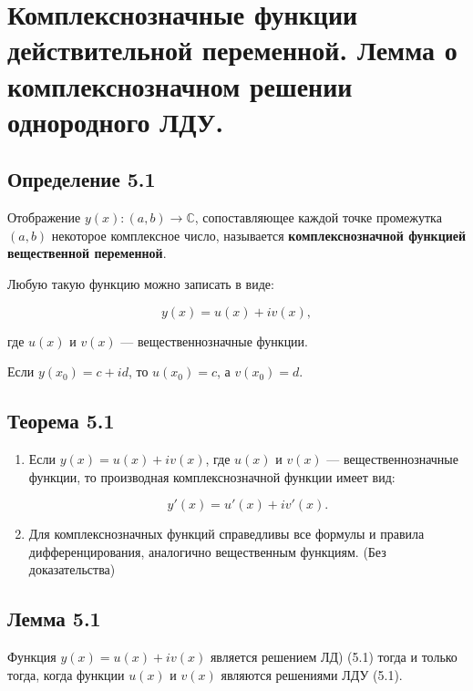 {
	\section{Комплекснозначные функции действительной переменной. Лемма о комплекснозначном решении однородного
	ЛДУ.}

	\subsection*{Определение 5.1}


	Отображение \( y(x) : (a, b) \rightarrow \mathbb{C} \), сопоставляющее каждой точке промежутка \( (a, b) \) некоторое комплексное число, называется \textbf{комплекснозначной функцией вещественной переменной}.

	Любую такую функцию можно записать в виде:


	\[
	y(x) = u(x) + iv(x),
	\]


	где \( u(x) \) и \( v(x) \) — вещественнозначные функции.

	Если \( y(x_0) = c + id \), то \( u(x_0) = c \), а \( v(x_0) = d \).

	\subsection*{Теорема 5.1}

	\begin{enumerate}
	\item Если \( y(x) = u(x) + i v(x) \), где \( u(x) \) и \( v(x) \) — вещественнозначные функции, то производная комплекснозначной функции имеет вид:
	

	\[
	y'(x) = u'(x) + i v'(x).
	\]



	\item Для комплекснозначных функций справедливы все формулы и правила дифференцирования, аналогично вещественным функциям. (Без доказательства)
	\end{enumerate}

	\vspace{1em}

	\subsection*{Лемма 5.1}

	Функция \( y(x) = u(x) + i v(x) \) является решением ЛД) (5.1) тогда и только тогда, когда функции \( u(x) \) и \( v(x) \) являются решениями ЛДУ (5.1).



	\newpage
}